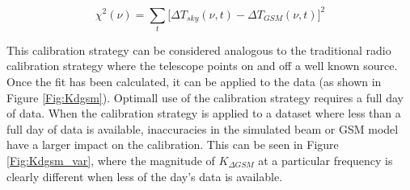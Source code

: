 \begin{equation}\label{Eq:chi_sq}
\chi^2(\nu) =  \sum_t \big [ \Delta T_{sky}(\nu,t) - \Delta T_{GSM}(\nu,t) \big ]^2
\end{equation}

This calibration strategy can be considered analogous to the traditional radio calibration strategy where the telescope points on and off a well known source. Once the fit has been calculated, it can be applied to the data (as shown in Figure \ref{Fig:Kdgsm}). Optimall use of the calibration strategy requires a full day of data. When the calibration strategy is applied to a dataset where less than a full day of data is available, inaccuracies in the simulated beam or GSM model have a larger impact on the calibration. This can be seen in Figure \ref{Fig:Kdgsm_var}, where the magnitude of $K_{\Delta GSM}$ at a particular frequency is clearly different when less of the day's data is available. 


